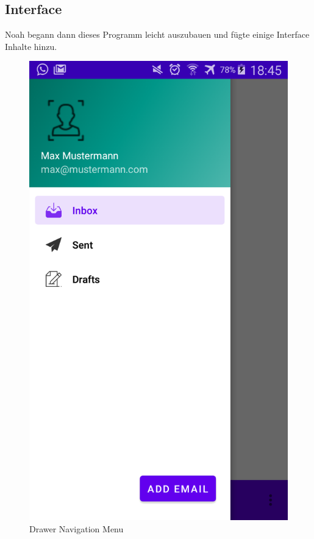 \documentclass[a4paper,11pt]{article}
\begin{document}

\subsection{Interface}

Noah begann dann dieses Programm leicht auszubauen und fügte einige Interface Inhalte hinzu. 

\begingroup
\setlength{\intextsep}{10pt}
\setlength{\columnsep}{15pt}

\begin{figure}
\centering
\includegraphics[scale=.15]{media/drawer.png}
\caption{Drawer Navigation Menu}
\end{figure}
\end{document}
